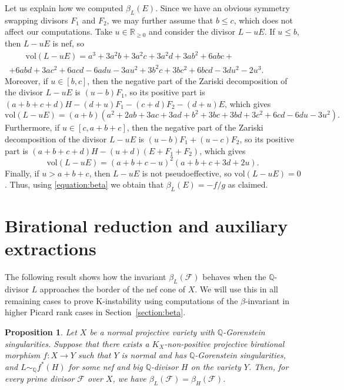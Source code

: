 \documentclass[12pt]{amsart}
\newtheorem{proposition}[theorem]{Proposition}
\theoremstyle{definition}
\theoremstyle{remark}
\begin{document}
Let us explain how we computed $\beta_{L}(E)$. Since we have an obvious symmetry swapping divisors $F_1$ and $F_2$, we may further assume that $b\leqslant c$, which does not affect our computations. Take $u\in\mathbb{R}_{\geqslant 0}$ and consider the divisor $L-uE$. If $u\leqslant b$, then $L-uE$ is nef, so
\begin{multline*}
\quad \quad \mathrm{vol}(L-uE)=a^3+3a^2b+3a^2c+3a^2d+3ab^2+6abc+\\
+6abd+3ac^2+6acd-6adu-3au^2+3b^2c+3bc^2+6bcd-3du^2-2u^3.\quad \quad \quad \quad
\end{multline*}
Moreover, if $u\in[b,c]$, then the negative part of the Zariski decomposition of the divisor $L-uE$ is $(u - b)F_1$, so its positive part is $(a+b+c+d)H-(d+u)F_1-(c+d)F_2-(d+u)E$, which gives
$$
\mathrm{vol}(L-uE)=(a+b)(a^2+2ab+3ac+3ad+b^2+3bc+3bd+3c^2+6cd-6du-3u^2).
$$
Furthermore, if $u\in[c,a+b+c]$, then the negative part of the Zariski decomposition of the divisor $L-uE$ is $(u-b)F_1+(u-c)F_2$, so its positive part is $(a+b+c+d)H-(u+d)(E+F_1+F_2)$, which gives
$$
\mathrm{vol}(L-uE)=(a+b+c-u)^2(a+b+c+3d+2u).
$$
Finally, if $u>a+b+c$, then $L-uE$ is not pseudoeffective, so $\mathrm{vol}(L-uE)=0$. Thus, using \eqref{equation:beta} we obtain that $\beta_{L}(E)=-f/g$ as claimed.


\section{Birational reduction and auxiliary extractions}\label{section:birational-reduction}

The following result shows how the invariant $\beta_L(\mathscr{F})$ behaves when the $\mathbb{Q}$-divisor $L$
approaches the border of the nef cone of $X$. We will use this in all remaining cases to prove K-instability using computations of the $\beta$-invariant in higher Picard rank cases in Section~\ref{section:beta}.

\begin{proposition}
\label{proposition:Paolo-2}
Let $X$ be a normal projective variety with $\mathbb{Q}$-Gorenstein singularities.
Suppose that there exists a $K_X$-non-positive projective birational morphism $f\colon X\to Y$ such that $Y$ is normal and has $\mathbb{Q}$-Gorenstein  singularities,
and $L\sim_{\mathbb{Q}}f^*(H)$ for some nef and big $\mathbb{Q}$-divisor $H$ on the variety  $Y$.
Then, for every prime divisor $\mathscr{F}$ over $X$, we have 
$\beta_L(\mathscr{F})=\beta_H(\mathscr{F})$.
\end{proposition}
\end{document}
